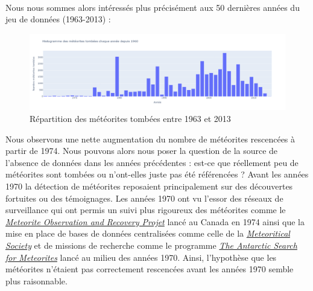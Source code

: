\documentclass[12pt]{article}
\begin{document}
\\
Nous nous sommes alors intéressés plus précisément aux 50 dernières années du jeu de données (1963-2013) :\\
\begin{figure}[H]
\centering
\includegraphics[width=14cm]{Images/exploration/histogramme1963-2013.png}
\caption{Répartition des météorites tombées entre 1963 et 2013}
\end{figure}
Nous observons une nette augmentation du nombre de météorites rescencées à partir de 1974. Nous pouvons alors nous poser la question de la source de l'absence de données dans les années précédentes : est-ce que réellement peu de météorites sont tombées ou n'ont-elles juste pas été référencées ? Avant les années 1970 la détection de météorites reposaient principalement sur des découvertes fortuites ou des témoignages. Les années 1970 ont vu l'essor des réseaux de surveillance qui ont permis un suivi plus rigoureux des météorites comme le \href{https://onlinelibrary.wiley.com/doi/abs/10.1111/j.1945-5100.1989.tb00959.x}{\textit{Meteorite Observation and Recovery Projet}} lancé au Canada en 1974 ainsi que la mise en place de bases de données centralisées comme celle de la \href{https://www.lpi.usra.edu/meteor/metbull.php}{\textit{Meteoritical Society}} et de missions de recherche comme le programme \href{https://caslabs.case.edu/ansmet/faqs/}{\textit{The Antarctic Search for Meteorites}} lancé au milieu des années 1970. Ainsi, l'hypothèse que les météorites n'étaient pas correctement rescencées avant les années 1970 semble plus raisonnable.
\end{document}
